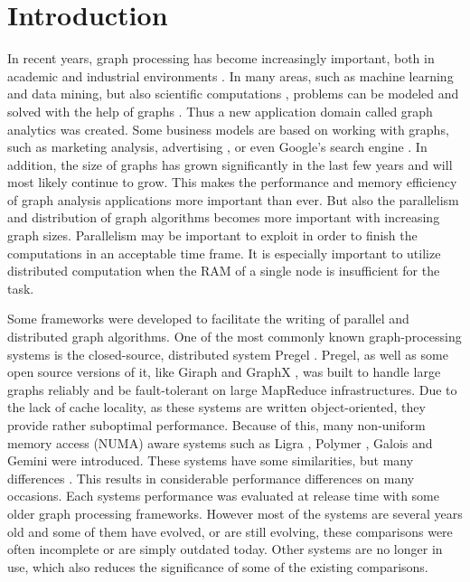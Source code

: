 \section{Introduction}
In recent years, graph processing has become increasingly important, both in academic and industrial environments \cite{Gemini}.
In many areas, such as machine learning and data mining, but also scientific computations , problems can be modeled and solved with the help of graphs \cite{Polymer}.
Thus a new application domain called graph analytics was created.
Some business models are based on working with graphs, such as marketing analysis, advertising , or even Google's search engine \cite{pagerank}.
In addition, the size of graphs has grown significantly in the last few years and will most likely continue to grow.
This makes the performance and memory efficiency of graph analysis applications more important than ever.
But also the parallelism and distribution of graph algorithms becomes more important with increasing graph sizes.
Parallelism may be important to exploit in order to finish the computations in an acceptable time frame. 
It is especially important to utilize distributed computation when the RAM of a single node is insufficient for the task.

Some frameworks were developed to facilitate the writing of parallel and distributed graph algorithms.
One of the most commonly known graph-processing systems is the closed-source, distributed system Pregel \cite{pregel}.
Pregel, as well as some open source versions of it, like Giraph \cite{Giraph} and GraphX \cite{graphx}, was built to handle large graphs reliably and be fault-tolerant on large MapReduce infrastructures.
Due to the lack of cache locality, as these systems are written object-oriented, they provide rather suboptimal performance.
Because of this, many non-uniform memory access (NUMA) aware systems such as Ligra \cite{Ligra}, Polymer \cite{Polymer}, Galois \cite{Galois} and Gemini \cite{Gemini} were introduced.
These systems have some similarities, but many differences . This results in considerable performance differences on many occasions.
Each systems performance was evaluated at release time with some older graph processing frameworks.
However most of the systems are several years old and some of them have evolved, or are still evolving, these comparisons were often incomplete or are simply outdated today.
Other systems are no longer in use, which also reduces the significance of some of the existing comparisons.

